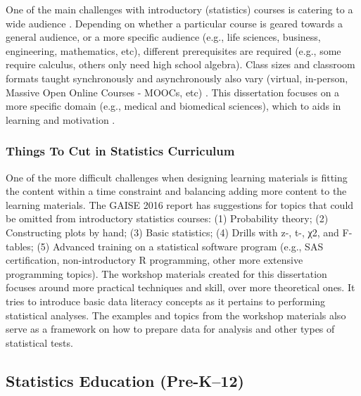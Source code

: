 \documentclass[010-intro.tex]{subfiles}
\begin{document}
    One of the main challenges with introductory (statistics) courses is catering to a wide audience
    \cite{gaise2016}.
    Depending on whether a particular course is geared towards a general audience, or a more specific audience
    (e.g., life sciences, business, engineering, mathematics, etc),
    different prerequisites are required
    (e.g., some require calculus, others only need high school algebra).
    Class sizes and classroom formats taught synchronously and asynchronously also vary
    (virtual, in-person, Massive Open Online Courses - MOOCs, etc)
    \cite{gaise2016}.
    This dissertation focuses on a more specific domain (e.g., medical and biomedical sciences),
    which to aids in learning and motivation
    \cite{ambrose2010learning, wilson2019teaching, krossDemocratizationDataScience2020}.

    \subsubsection{Things To Cut in Statistics Curriculum}

        One of the more difficult challenges when designing learning materials is fitting the content within a time constraint
        and balancing adding more content to the learning materials. %
        The GAISE 2016 report has suggestions for topics that could be omitted from introductory statistics courses:
        (1) Probability theory;
        (2) Constructing plots by hand;
        (3) Basic statistics;
        (4) Drills with z-, t-, χ2, and F-tables;
        (5) Advanced training on a statistical software program
            (e.g., SAS certification, non-introductory R programming, other more extensive programming topics).
        The workshop materials created for this dissertation
        focuses around more practical techniques and skill, over more theoretical ones.
        It tries to introduce basic data literacy concepts as it pertains to performing statistical analyses.
        The examples and topics from the workshop materials
        also serve as a framework on how to prepare data for analysis and other types of statistical tests.

\subsection{Statistics Education (Pre-K–12)}
\label{sse:statsk12}
\end{document}

